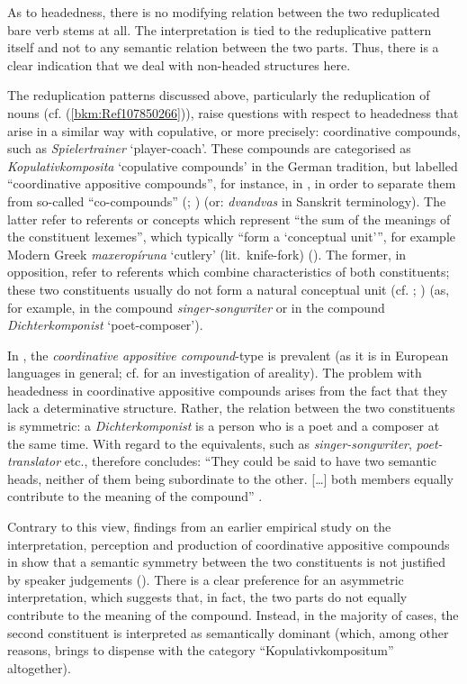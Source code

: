\documentclass[output=paper
  ,nobabel
  ,draftmode
  ,colorlinks, citecolor=brown
]{langscibook}
\begin{document}
As to headedness, there is no modifying relation between the two reduplicated bare verb stems at
all. The interpretation is tied to the reduplicative pattern itself and not to any semantic relation
between the two parts. Thus, there is a clear indication that we deal with non-headed structures
here.

The reduplication patterns discussed above, particularly the reduplication of nouns
(cf. (\ref{bkm:Ref107850266})), raise questions with respect to headedness that arise in a similar
way with copulative, or more precisely: coordinative compounds, such as \emph{Spielertrainer}
`player-coach'. These compounds are categorised as \emph{Kopulativkomposita} `copulative compounds'
in the German tradition, but labelled ``coordinative appositive compounds'', for instance, in , in order to separate them from so-called ``co-compounds'' (\citealt{Waelchli2005};
\citealt{Arcodia2018}) (or: \emph{dvandvas} in Sanskrit terminology). The latter refer to referents
or concepts which represent ``the sum of the meanings of the constituent lexemes'', which typically
``form a `conceptual unit''', for example Modern Greek \emph{maxeropíruna} `cutlery' (lit.\
knife-fork) (\citealt[1198–1199]{Arcodia2018}). The former, in opposition, refer to referents which
combine characteristics of both constituents; these two constituents usually do not form a natural
conceptual unit (cf. \citealt[5]{Waelchli2005}; \citealt[1198]{Arcodia2018}) (as, for example, in the
\ili{English} compound \emph{singer-songwriter} or in the \ili{German} compound \emph{Dichterkomponist}
`poet-composer').

\largerpage
In , the \emph{coordinative appositive compound}{}-type is prevalent (as it is in European
languages in general; cf. \citealt{Arcodia2018} for an investigation of areality). The problem with
headedness in \ili{German} coordinative appositive compounds arises from the fact that they lack a
determinative structure. Rather, the relation between the two constituents is symmetric: a
\emph{Dichterkomponist} is a person who is a poet and a composer at the same time. With regard to
the \ili{English} equivalents, such as \emph{singer-songwriter}, \emph{poet-translator} etc.,
\citet{Plag2003} therefore concludes: ``They could be said to have two semantic heads, neither of
them being subordinate to the other. […] both members equally contribute to the meaning of the
compound'' \citep[146]{Plag2003}.

Contrary to this view, findings from an earlier empirical study on the interpretation, perception
and production of coordinative appositive compounds in \ili{German} show that a semantic symmetry between
the two constituents is not justified by speaker judgements (\citealt{BreindlThurmair1992}). There
is a clear preference for an asymmetric interpretation, which suggests that, in fact, the two parts
do not equally contribute to the meaning of the compound. Instead, in the majority of cases, the
second constituent is interpreted as semantically dominant (which, among other reasons, brings
\citeauthor{BreindlThurmair1992} to dispense with the category ``Kopulativkompositum'' altogether).
\end{document}
